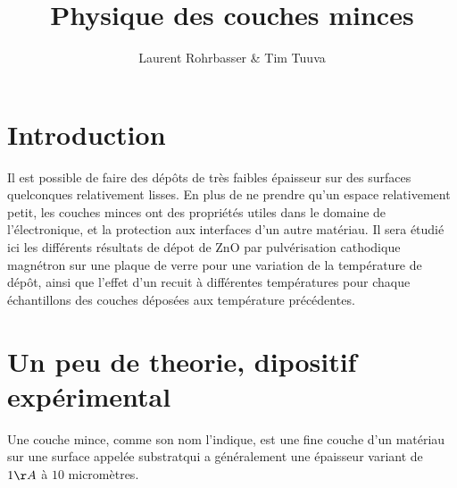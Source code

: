 \documentclass[a4paper,12pt,oneside]{article}
\begin{document}
\title{Physique des couches minces}
\author{Laurent Rohrbasser \& Tim Tuuva}

\maketitle
\tableofcontents
\baselineskip=16pt
\parindent=15pt
\parskip=5pt


\newpage


\section{Introduction}
Il est possible de faire des dépôts de très faibles épaisseur sur des surfaces quelconques relativement lisses. En plus de ne prendre qu'un espace relativement petit, les couches minces ont des propriétés utiles dans le domaine de l'électronique, et la protection aux interfaces d'un autre matériau. Il sera étudié ici les différents résultats de dépot de ZnO par pulvérisation cathodique magnétron sur une plaque de verre pour une variation de la température de dépôt, ainsi que l'effet d'un recuit à différentes températures pour chaque échantillons des couches déposées aux température précédentes.

\section{Un peu de theorie, dipositif expérimental}

Une couche mince, comme son nom l'indique, est une fine couche d'un matériau sur une surface appelée substratqui a généralement une épaisseur variant de $1\AA$ à $10$ micromètres.
\end{document}

